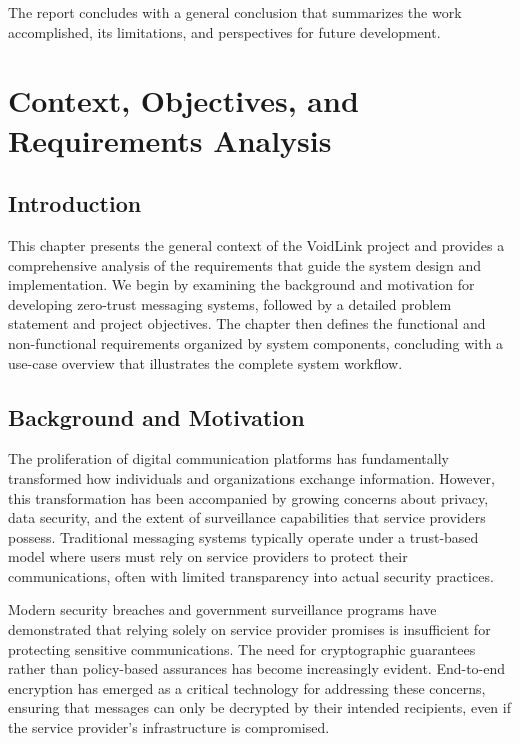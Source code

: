 \documentclass[12pt,a4paper,openany]{book}
\begin{document}
The report concludes with a general conclusion that summarizes the work accomplished, its limitations, and perspectives for future development.

\newpage

\setcounter{chapter}{0} %
\chapter{Context, Objectives, and Requirements Analysis}
\label{ch:context_requirements}

\section*{Introduction}

This chapter presents the general context of the VoidLink project and provides a comprehensive analysis of the requirements that guide the system design and implementation. We begin by examining the background and motivation for developing zero-trust messaging systems, followed by a detailed problem statement and project objectives. The chapter then defines the functional and non-functional requirements organized by system components, concluding with a use-case overview that illustrates the complete system workflow.

\section{Background and Motivation}

The proliferation of digital communication platforms has fundamentally transformed how individuals and organizations exchange information. However, this transformation has been accompanied by growing concerns about privacy, data security, and the extent of surveillance capabilities that service providers possess. Traditional messaging systems typically operate under a trust-based model where users must rely on service providers to protect their communications, often with limited transparency into actual security practices.

Modern security breaches and government surveillance programs have demonstrated that relying solely on service provider promises is insufficient for protecting sensitive communications. The need for cryptographic guarantees rather than policy-based assurances has become increasingly evident. End-to-end encryption \cite{e2ee-messaging} has emerged as a critical technology for addressing these concerns, ensuring that messages can only be decrypted by their intended recipients, even if the service provider's infrastructure is compromised.
\end{document}
